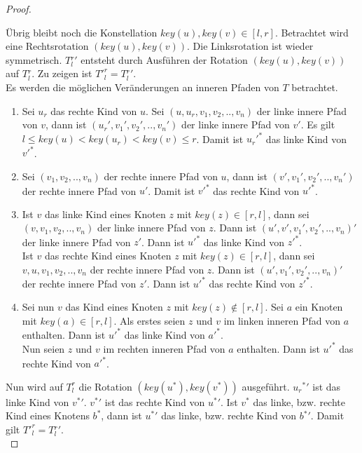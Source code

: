 \documentclass[a4paper,12pt]{article}
\begin{document}
\begin{proof}
\begin{enumerate}
	\end{enumerate}	
	\noindent Übrig bleibt noch die Konstellation $\mathit{key}\left(u\right),\mathit{key}(v) \in \left[l,r\right]$. 
	Betrachtet wird eine Rechtsrotation $\left(\mathit{key}\left(u\right),\mathit{key}\left(v\right)\right)$. Die Linksrotation ist wieder symmetrisch. 
	 $T{^r_l}'$ entsteht durch Ausführen der Rotation  $\left(\mathit{key}\left(u\right),\mathit{key}\left(v\right)\right)$ auf $T{^r_l}$. Zu zeigen ist ${T'}^r_l = T{^r_l}' $.\\
	Es werden die möglichen Veränderungen an inneren Pfaden von $T$ betrachtet.
	\begin{enumerate}
		\item Sei $u_r$ das rechte Kind von $u$. Sei $\left(u,u_r,v_1, v_2,..,v_n\right)$ der linke innere Pfad von $v$, dann ist $\left({u_r}',{v_1}',{v_2}',..,{v_n}'\right)$ der linke innere Pfad von $v'$. Es gilt ${l \leq \mathit{key}\left(u\right) < \mathit{key}\left(u_r\right) < \mathit{key}\left(v\right) \leq r}$. Damit ist ${{u_r}'}^*$ das linke Kind von ${v'}^*$.
		\item Sei $\left(v_1, v_2,..,v_n\right)$ der rechte innere Pfad von $u$, dann ist $\left(v',{v_1}', {v_2}',..,{v_n}'\right)$ der rechte innere Pfad von $u'$. Damit ist ${v'}^*$ das rechte Kind von ${u'}^*$.
		\item Ist $v$ das linke Kind eines Knoten $z$ mit $\mathit{key}(z) \in \left[r,l\right]$, dann sei  $\left(v,v_1, v_2,..,v_n\right)$ der linke innere Pfad von $z$. Dann ist  $\left(u',v',{v_1}', {v_2}',..,{v_n}\right)'$ der linke innere Pfad von $z'$. Dann ist ${u'}^*$ das linke Kind von ${z'}^*$.\\
		Ist $v$ das rechte Kind eines Knoten $z$ mit $\mathit{key}(z) \in \left[r,l\right]$, dann sei  $v,u, v_1, v_2,..,v_n$ der rechte innere Pfad von $z$. Dann ist  $\left(u',{v_1}', {v_2}',..,{v_n}\right)'$ der rechte innere Pfad von $z'$. Dann ist ${u'}^*$ das rechte Kind von ${z'}^*$.
		\item  Sei nun $v$ das Kind eines Knoten $z$ mit $\mathit{key}(z) \notin \left[r,l\right]$. Sei $a$ ein Knoten mit $\mathit{key}(a) \in \left[r,l\right]$. 
		Als erstes seien $z$ und $v$ im linken inneren Pfad von $a$ enthalten. Dann ist ${{u}'}^*$ das linke Kind von ${a'}^*$.\\
		Nun seien $z$ und $v$ im rechten inneren Pfad von $a$ enthalten. Dann ist ${{u}'}^*$ das rechte Kind von ${a'}^*$.\\
	\end{enumerate}
	\noindent Nun wird auf ${T}^r_l$ die Rotation $ \left(\mathit{key}\left(u^*\right),\mathit{key}\left(v^*\right)\right)$ ausgeführt. ${{u_r}^*}'$ ist das linke Kind von $v{^*}'$. $v{^*}'$ ist das rechte Kind von $u{^*}'$. Ist $v^*$ das linke, bzw. rechte Kind eines Knotens $b^*$, dann ist $u{^*}'$ das linke, bzw. rechte Kind von $b{^*}'$.
	 Damit gilt ${T'}^r_l = T{^r_l}'$.\\
	
\end{proof}
\end{document}
